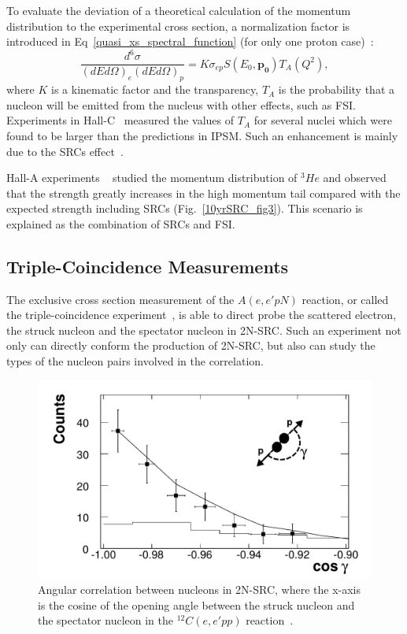 To evaluate the deviation of a theoretical calculation of the momentum distribution to the experimental cross section, a normalization factor is introduced in Eq~\eqref{quasi_xs_spectral_function} (for only one proton case)~\cite{Higinbotham:2009hi}:
\begin{equation}
  \frac{d^{6}\sigma}{(dEd\Omega)_{e}(dEd\Omega)_{p}} = K\sigma_{ep}S(E_{0},\mathbf{p_{0}})T_{A}(Q^{2}),
\end{equation}
where $K$ is a kinematic factor and the transparency, $T_{A}$ is the probability that a nucleon will be emitted from the nucleus with other effects, such as FSI. Experiments in Hall-C~\cite{PhysRevLett.80.5072,PhysRevC.66.044613,PhysRevC.72.054602} measured the values of $T_{A}$ for several nuclei which were found to be larger than the predictions in IPSM. Such an enhancement is mainly due to the SRCs effect~\cite{Higinbotham:2009hi}. 

Hall-A experiments ~\cite{PhysRevLett.94.082305,PhysRevLett.94.192302} studied the momentum distribution of $^{3}He$ and observed that the strength greatly increases in the high momentum tail compared with the expected strength including SRCs (Fig.~\ref{10yrSRC_fig3}). This scenario is explained as the combination of SRCs and FSI. 

\subsection{Triple-Coincidence Measurements}
The exclusive cross section measurement of the $A(e,e'pN)$ reaction, or called the triple-coincidence experiment~\cite{PhysRevLett.90.042301,PhysRevLett.99.072501,src_since}, is able to direct probe the scattered electron, the struck nucleon and the spectator nucleon in 2N-SRC. Such an experiment not only can directly conform the production of 2N-SRC, but also can study the types of the nucleon pairs involved in the correlation.  
\begin{figure}[!ht]
  \begin{center}
    \includegraphics[type=pdf,ext=.pdf,read=.pdf,width=0.60\linewidth]{./figures/physics/10yrSRC_fig5}
    \caption[Angular correlation between nucleons in 2N-SRC]{\footnotesize{Angular correlation between nucleons in 2N-SRC, where the x-axis is the cosine of the opening angle between the struck nucleon and the spectator nucleon in the $^{12}C(e,e'pp)$ reaction~\cite{PhysRevLett.99.072501}.}}
    \label{triple_src_cos}
  \end{center}
\end{figure} 

